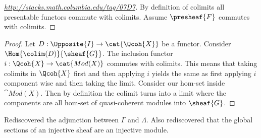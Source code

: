 \begin{proof}[\url{http://stacks.math.columbia.edu/tag/07D7}]
By definition of colimits all presentable functors commute with colimits. 
Assume $\presheaf{F}$ commutes with colimits.


\end{proof}

\begin{proof}
Let $D:\Opposite{I}\rightarrow \cat{\Qcoh{X}}$ be a functor. 
Consider $\Hom{\colim(D)}{\sheaf{G}}$. The inclusion functor $i:\Qcoh{X}\rightarrow \cat{Mod(X)}$ commutes with colimits. This means that taking colimits in $\Qcoh{X}$ first and then applying $i$ yields the same as first applying $i$ component wise and then taking the limit.
Consider our hom-set inside $\cat{Mod(X)}$. Then by definition the colimit turns into a limit where the components are all hom-set of quasi-coherent modules into $\sheaf{G}$. 
\end{proof}





\color{red}
Rediscovered the adjunction between $\Gamma$ and $\Lambda$. 
Also rediscovered that the global sections of an injective sheaf are an injective module.
\color{red}
